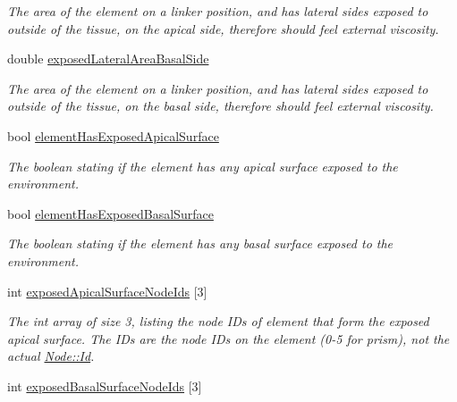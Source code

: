 \begin{DoxyCompactItemize}
\begin{DoxyCompactList}\small\item\em The area of the element on a linker position, and has lateral sides exposed to outside of the tissue, on the apical side, therefore should feel external viscosity. \end{DoxyCompactList}\item 
\hypertarget{classShapeBase_a3ba637ddf764ae673d616f7318270866}{}double \hyperlink{classShapeBase_a3ba637ddf764ae673d616f7318270866}{exposed\+Lateral\+Area\+Basal\+Side}\label{classShapeBase_a3ba637ddf764ae673d616f7318270866}

\begin{DoxyCompactList}\small\item\em The area of the element on a linker position, and has lateral sides exposed to outside of the tissue, on the basal side, therefore should feel external viscosity. \end{DoxyCompactList}\item 
\hypertarget{classShapeBase_ab5dfa04e7a8c7f2c33bea431ca441674}{}bool \hyperlink{classShapeBase_ab5dfa04e7a8c7f2c33bea431ca441674}{element\+Has\+Exposed\+Apical\+Surface}\label{classShapeBase_ab5dfa04e7a8c7f2c33bea431ca441674}

\begin{DoxyCompactList}\small\item\em The boolean stating if the element has any apical surface exposed to the environment. \end{DoxyCompactList}\item 
\hypertarget{classShapeBase_a194437fa296d9e12e58cc14fa8d66931}{}bool \hyperlink{classShapeBase_a194437fa296d9e12e58cc14fa8d66931}{element\+Has\+Exposed\+Basal\+Surface}\label{classShapeBase_a194437fa296d9e12e58cc14fa8d66931}

\begin{DoxyCompactList}\small\item\em The boolean stating if the element has any basal surface exposed to the environment. \end{DoxyCompactList}\item 
\hypertarget{classShapeBase_a7987e6fc21a5035fc04558f1b366406a}{}int \hyperlink{classShapeBase_a7987e6fc21a5035fc04558f1b366406a}{exposed\+Apical\+Surface\+Node\+Ids} \mbox{[}3\mbox{]}\label{classShapeBase_a7987e6fc21a5035fc04558f1b366406a}

\begin{DoxyCompactList}\small\item\em The int array of size 3, listing the node I\+Ds of element that form the exposed apical surface. The I\+Ds are the node I\+Ds on the element (0-\/5 for prism), not the actual \hyperlink{classNode_a1bd379569cc1a8b96432e61971aed4d9}{Node\+::\+Id}. \end{DoxyCompactList}\item 
\hypertarget{classShapeBase_a7bc7714f5622b21ec7fba51e1136803f}{}int \hyperlink{classShapeBase_a7bc7714f5622b21ec7fba51e1136803f}{exposed\+Basal\+Surface\+Node\+Ids} \mbox{[}3\mbox{]}\label{classShapeBase_a7bc7714f5622b21ec7fba51e1136803f}


\end{DoxyCompactItemize}
